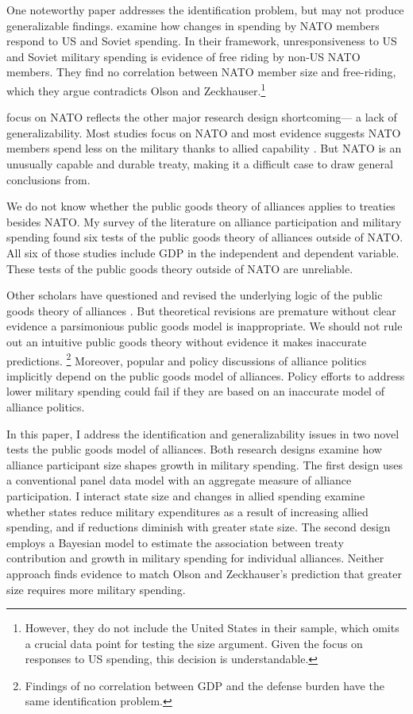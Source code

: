 \documentclass[12pt]{article}
\begin{document}
One noteworthy paper addresses the identification problem, but may not produce generalizable findings. 
\citet{PluemperNeumayer2015} examine how changes in spending by NATO members respond to US and Soviet spending. 
In their framework, unresponsiveness to US and Soviet military spending is evidence of free riding by non-US NATO members.
They find no correlation between NATO member size and free-riding, which they argue contradicts Olson and Zeckhauser.\footnote{
However, they do not include the United States in their sample, which omits a crucial data point for testing the size argument. Given the focus on responses to US spending, this decision is understandable.}


\citet{PluemperNeumayer2015} focus on NATO reflects the other major research design shortcoming--- a lack of generalizability. 
Most studies focus on NATO and most evidence suggests NATO members spend less on the military thanks to allied capability \citep{GeorgeSandler2017}.
But NATO is an unusually capable and durable treaty, making it a difficult case to draw general conclusions from. 


We do not know whether the public goods theory of alliances applies to treaties besides NATO. 
My survey of the literature on alliance participation and military spending found six tests of the public goods theory of alliances outside of NATO. 
All six of those studies include GDP in the independent and dependent variable. 
These tests of the public goods theory outside of NATO are unreliable. 


Other scholars have questioned and revised the underlying logic of the public goods theory of alliances \citep{Palmer1990, SandlerHartley2001}.  
But theoretical revisions are premature without clear evidence a parsimonious public goods model is inappropriate. 
We should not rule out an intuitive public goods theory without evidence it makes inaccurate predictions.
\footnote{Findings of no correlation between GDP and the defense burden have the same identification problem.} 
Moreover, popular and policy discussions of alliance politics implicitly depend on the public goods model of alliances. 
Policy efforts to address lower military spending could fail if they are based on an inaccurate model of alliance politics. 


In this paper, I address the identification and generalizability issues in two novel tests the public goods model of alliances.  
Both research designs examine how alliance participant size shapes growth in military spending. 
The first design uses a conventional panel data model with an aggregate measure of alliance participation. 
I interact state size and changes in allied spending examine whether states reduce military expenditures as a result of increasing allied spending, and if reductions diminish with greater state size. 
The second design employs a Bayesian model to estimate the association between treaty contribution and growth in military spending for individual alliances. 
Neither approach finds evidence to match Olson and Zeckhauser's prediction that greater size requires more military spending. 
\end{document}
